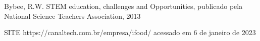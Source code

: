 \documentclass[
12pt,		%
openright,	%
twoside,  %
a4paper,			%
chapter=TITLE,		%
english,			%
french,				%
spanish,			%
brazil				%
]{USPSC-classe/USPSC}
\begin{document}
\begin{flushleft}
\begin{flushleft}
\begin{flushleft}
\begin{flushleft}
\begin{flushleft}
\begin{flushleft}
\begin{flushleft}
\begin{flushleft}
\begin{flushleft}
[BYBEE, 2013] Bybee, R.W. STEM education, challenges and Opportunities, publicado pela National Science Teachers Association, 2013
\end{flushleft}


\end{flushleft}


\end{flushleft}


\end{flushleft}


\end{flushleft}


\end{flushleft}


\end{flushleft}


\end{flushleft}


\end{flushleft}


\begin{flushleft}
\begin{flushleft}
\begin{flushleft}
\begin{flushleft}
\begin{flushleft}
\begin{flushleft}
\begin{flushleft}
\begin{flushleft}
\begin{flushleft}
[CANALTECH, 2022] SITE https://canaltech.com.br/empresa/ifood/ acessado em 6 de janeiro de 2023
\end{flushleft}


\end{flushleft}


\end{flushleft}


\end{flushleft}


\end{flushleft}


\end{flushleft}


\end{flushleft}


\end{flushleft}


\end{flushleft}
\end{document}

